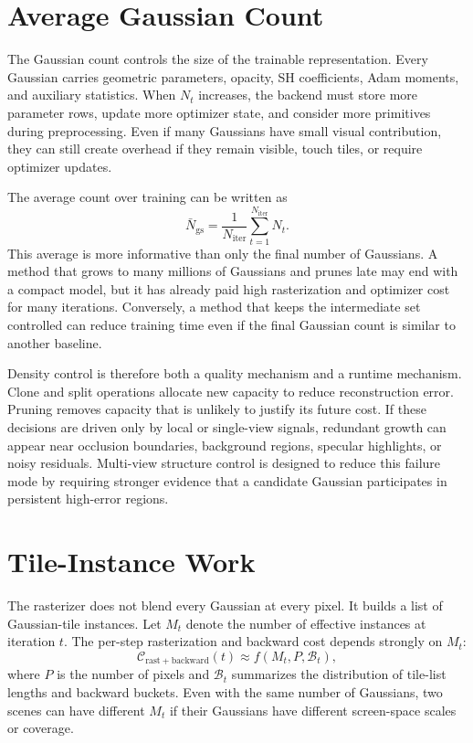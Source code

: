 \section{Average Gaussian Count}

The Gaussian count controls the size of the trainable representation. Every Gaussian carries geometric parameters, opacity, SH coefficients, Adam moments, and auxiliary statistics. When $N_t$ increases, the backend must store more parameter rows, update more optimizer state, and consider more primitives during preprocessing. Even if many Gaussians have small visual contribution, they can still create overhead if they remain visible, touch tiles, or require optimizer updates.

The average count over training can be written as
\begin{equation}
\bar{N}_{\mathrm{gs}}
=
\frac{1}{N_{\mathrm{iter}}}
\sum_{t=1}^{N_{\mathrm{iter}}} N_t .
\end{equation}
This average is more informative than only the final number of Gaussians. A method that grows to many millions of Gaussians and prunes late may end with a compact model, but it has already paid high rasterization and optimizer cost for many iterations. Conversely, a method that keeps the intermediate set controlled can reduce training time even if the final Gaussian count is similar to another baseline.

Density control is therefore both a quality mechanism and a runtime mechanism. Clone and split operations allocate new capacity to reduce reconstruction error. Pruning removes capacity that is unlikely to justify its future cost. If these decisions are driven only by local or single-view signals, redundant growth can appear near occlusion boundaries, background regions, specular highlights, or noisy residuals. Multi-view structure control is designed to reduce this failure mode by requiring stronger evidence that a candidate Gaussian participates in persistent high-error regions.

\section{Tile-Instance Work}

The rasterizer does not blend every Gaussian at every pixel. It builds a list of Gaussian-tile instances. Let $M_t$ denote the number of effective instances at iteration $t$. The per-step rasterization and backward cost depends strongly on $M_t$:
\begin{equation}
\mathcal{C}_{\mathrm{rast+backward}}(t)
\approx
f(M_t,P,\mathcal{B}_t),
\end{equation}
where $P$ is the number of pixels and $\mathcal{B}_t$ summarizes the distribution of tile-list lengths and backward buckets. Even with the same number of Gaussians, two scenes can have different $M_t$ if their Gaussians have different screen-space scales or coverage.

